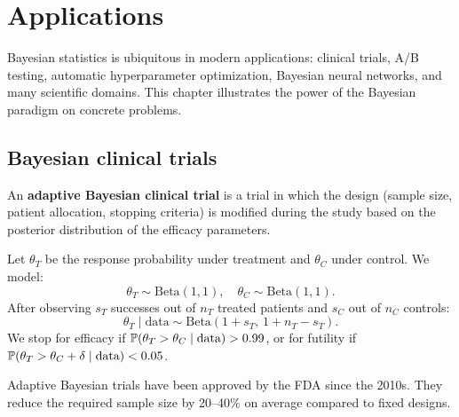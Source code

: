 \chapter{Applications}
\label{ch:applications}

\begin{intuition}[title=\textbf{Central idea}]
Bayesian statistics is ubiquitous in modern applications: clinical trials,
A/B testing, automatic hyperparameter optimization, Bayesian neural networks,
and many scientific domains. This chapter illustrates the power of the
Bayesian paradigm on concrete problems.
\end{intuition}

\section{Bayesian clinical trials}

\begin{definition}
An \textbf{adaptive Bayesian clinical trial} is a trial in which the design
(sample size, patient allocation, stopping criteria) is modified during the
study based on the posterior distribution of the efficacy parameters.
\end{definition}

\begin{example}
Let $\theta_T$ be the response probability under treatment and $\theta_C$
under control. We model:
\[
  \theta_T \sim \mathrm{Beta}(1, 1), \quad
  \theta_C \sim \mathrm{Beta}(1, 1).
\]
After observing $s_T$ successes out of $n_T$ treated patients and $s_C$
out of $n_C$ controls:
\[
  \theta_T \mid \text{data} \sim \mathrm{Beta}(1 + s_T,\, 1 + n_T - s_T).
\]
We stop for efficacy if $\mathbb{P}(\theta_T > \theta_C \mid \text{data}) > 0.99$,
or for futility if $\mathbb{P}(\theta_T > \theta_C + \delta \mid \text{data}) < 0.05$.
\end{example}

\begin{remark}
Adaptive Bayesian trials have been approved by the FDA since the 2010s.
They reduce the required sample size by 20--40\% on average compared to
fixed designs.
\end{remark}

